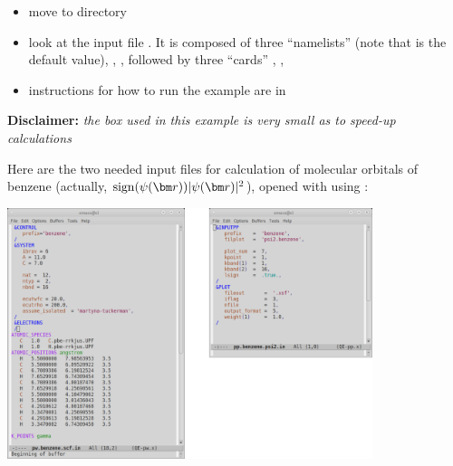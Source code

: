 \documentclass[landscape]{foils}
\DeclareMathOperator{\sign}{sign}
\begin{document}
\begin{itemize}
\item move to  directory
  \vspace{-0.5em}
\item look at the input file . It is composed of three
``namelists''  (note that 
is the default value), , , followed 
by three ``cards'' , ,
  \vspace{-0.5em}
\item instructions for how to run the example are in 
\end{itemize}
{\bf Disclaimer:} {\em the box used in this example is very small as to speed-up calculations}


Here are the two needed input files for calculation of molecular
orbitals of benzene (actually, $\sign(\psi(\vr))|\psi(\vr)|^2$),
opened with  using  :
\begin{center}
  \includegraphics[width=0.8\textwidth]{figs/inputs-benzene.png}
\end{center}

\end{document}
